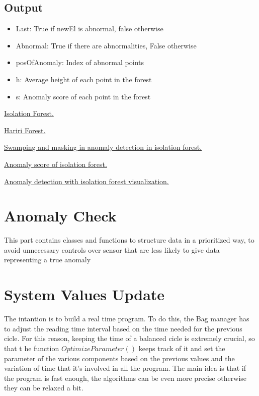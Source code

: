 \documentclass[journal]{IEEEtran}
\begin{document}
\subsection{Output}

\begin{itemize}
\item Last: True if newEl is abnormal, false otherwise
\item Abnormal: True if there are abnormalities, False otherwise
\item posOfAnomaly: Index of abnormal points
\item h: Average height of each point in the forest
\item s: Anomaly score of each point in the forest
\end{itemize}


\begin{thebibliography}{References}
\href{https://cs.nju.edu.cn/zhouzh/zhouzh.files/publication/icdm08b.pdf?q=isolation-forest}{Isolation Forest.}

 \href{http://www.ncsa.illinois.edu/Conferences/LSST18/assets/pdfs/hariri_forest.pdf}{Hariri Forest.}

 \href{https://medium.com/walmartlabs/swamping-and-masking-in-anomaly-detection-how-subsampling-in-isolation-forests-helps-mitigate-bb192a8f8dd5}{Swamping and masking in anomaly detection in isolation forest.}

 \href{https://scikit-learn.org/stable/modules/generated/sklearn.ensemble.IsolationForest.html}{Anomaly score of isolation forest.}

 \href{https://towardsdatascience.com/anomaly-detection-with-isolation-forest-visualization-23cd75c281e2}{Anomaly detection with isolation forest visualization.}

\end{thebibliography}


\section{Anomaly Check}
 
This part contains classes and functions to structure data in a prioritized way, 
to avoid unnecessary controls over sensor that are less likely to give data representing a true anomaly

\section{System Values Update}
The intantion is to build a real time program. To do this, the Bag manager has to adjust the reading time interval based on the time needed for the previous cicle.
For this reason, keeping the time of a balanced cicle is extremely crucial, so that t he function \(OptimizeParameter()\)
keeps track of it and set the parameter of the various components based on the previous values and the variation of time that it's involved in all the program.
The main idea is that if the program is fast enough, the algorithms can be even more precise otherwise they can be relaxed a bit.
\end{document}
